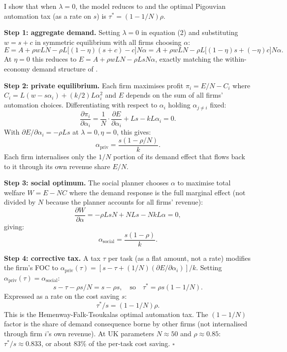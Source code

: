 \documentclass[11pt,letterpaper]{article}
\theoremstyle{remark}
\begin{document}
I show that when $\lambda = 0$, the model reduces to \citet{hemenway_falk_tsoukalas_2026} and the optimal Pigouvian automation tax (as a rate on $s$) is $\tau^* = (1 - 1/N) \rho$.

\textbf{Step 1: aggregate demand.} Setting $\lambda = 0$ in equation (2) and substituting $w = s + c$ in symmetric equilibrium with all firms choosing $\alpha$:
\[
E = A + \rho w L N - \rho L \big[(1-\eta)(s+c) - c\big] N \alpha = A + \rho w L N - \rho L \big[(1-\eta) s + (-\eta) c\big] N \alpha.
\]
At $\eta = 0$ this reduces to $E = A + \rho w L N - \rho L s N \alpha$, exactly matching the within-economy demand structure of \citet{hemenway_falk_tsoukalas_2026}.

\textbf{Step 2: private equilibrium.} Each firm maximises profit $\pi_i = E/N - C_i$ where $C_i = L(w - s\alpha_i) + (k/2)L\alpha_i^2$ and $E$ depends on the sum of all firms' automation choices. Differentiating with respect to $\alpha_i$ holding $\alpha_{j \neq i}$ fixed:
\[
\frac{\partial \pi_i}{\partial \alpha_i} = \frac{1}{N} \cdot \frac{\partial E}{\partial \alpha_i} + Ls - kL\alpha_i = 0.
\]
With $\partial E / \partial \alpha_i = -\rho L s$ at $\lambda = 0, \eta = 0$, this gives:
\[
\alpha_{\text{priv}} = \frac{s(1 - \rho/N)}{k}.
\]
Each firm internalises only the $1/N$ portion of its demand effect that flows back to it through its own revenue share $E/N$.

\textbf{Step 3: social optimum.} The social planner chooses $\alpha$ to maximise total welfare $W = E - N C$ where the demand response is the full marginal effect (not divided by $N$ because the planner accounts for all firms' revenue):
\[
\frac{\partial W}{\partial \alpha} = -\rho L s N + N L s - N k L \alpha = 0,
\]
giving:
\[
\alpha_{\text{social}} = \frac{s(1 - \rho)}{k}.
\]

\textbf{Step 4: corrective tax.} A tax $\tau$ per task (as a flat amount, not a rate) modifies the firm's FOC to $\alpha_{\text{priv}}(\tau) = [s - \tau + (1/N)(\partial E/\partial \alpha_i)]/k$. Setting $\alpha_{\text{priv}}(\tau) = \alpha_{\text{social}}$:
\[
s - \tau - \rho s/N = s - \rho s, \quad \text{so} \quad \tau^* = \rho s (1 - 1/N).
\]
Expressed as a rate on the cost saving $s$:
\[
\boxed{\tau^*/s = (1 - 1/N) \rho.}
\]
This is the Hemenway-Falk-Tsoukalas optimal automation tax. The $(1 - 1/N)$ factor is the share of demand consequence borne by other firms (not internalised through firm $i$'s own revenue). At UK parameters $N \approx 50$ and $\rho \approx 0.85$: $\tau^*/s \approx 0.833$, or about 83\% of the per-task cost saving. \hfill$\square$
\end{document}
